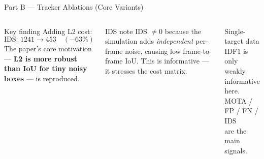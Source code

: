 \documentclass[aspectratio=169, 10pt]{beamer}
\begin{document}
\begin{frame}{Part B — Tracker Ablations (Core Variants)}
\begin{columns}[T]

    \begin{block}{Key finding}
      Adding L2 cost:
      \[
        \text{IDS: } 1241 \to 453 \quad (-63\%)
      \]
      The paper's core motivation — \textbf{L2 is more robust than IoU for tiny noisy boxes} — is reproduced.
    \end{block}

    \vspace{0.4em}
    \begin{block}{IDS note}
      IDS $\neq 0$ because the simulation adds \emph{independent} per-frame noise, causing low frame-to-frame IoU.
      This is informative — it stresses the cost matrix.
    \end{block}

    \vspace{0.4em}
    \begin{alertblock}{Single-target data}
      IDF1 is only weakly\\
      informative here.\\
      MOTA / FP / FN / IDS\\
      are the main signals.
    \end{alertblock}

  \end{columns}
\end{frame}
\end{document}
